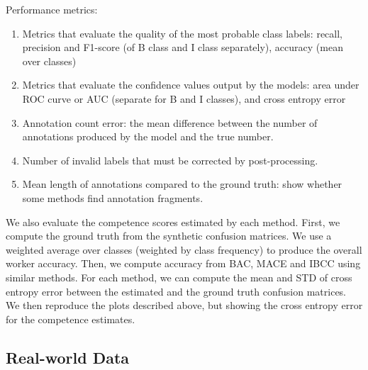 Performance metrics:
\begin{enumerate}
  \item Metrics that evaluate the quality of the most probable class labels: recall, precision and F1-score (of B class and I class separately), accuracy (mean over classes)
  \item Metrics that evaluate the confidence values output by the models: area under ROC curve or AUC (separate for B and I classes), and cross entropy error %
  \item Annotation count error: the mean difference between the number of annotations produced by the model and the true number.
  \item Number of invalid labels that must be corrected by post-processing.
  \item Mean length of annotations compared to the ground truth: show whether some methods find annotation fragments.
\end{enumerate}

We also evaluate the competence scores estimated by each method. First, we compute the ground truth from the 
synthetic confusion matrices. We use a weighted average over classes (weighted by class frequency) to produce the 
overall worker accuracy. Then, we compute accuracy from BAC, MACE and IBCC using similar methods. 
For each method, we can compute the mean and STD of cross entropy error between the estimated and the ground truth
 confusion matrices. We then reproduce the plots described above, but showing the cross entropy error for the 
 competence estimates. 

\subsection{Real-world Data}

